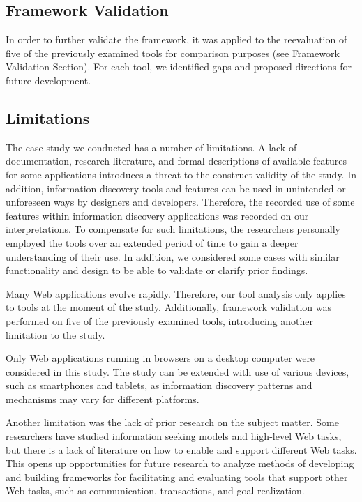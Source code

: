 \documentclass{sigchi}
\begin{document}
{\subsection{Framework Validation}
\label{subsection:validating}
In order to further validate the framework, it was applied to the reevaluation of five of the previously examined tools for comparison purposes (see Framework Validation Section). For each tool, we identified gaps and proposed directions for future development. 
}%
\pagebreak

{\subsection{Limitations}
The case study we conducted has a number of limitations. A lack of documentation, research literature, and formal descriptions of available features for some applications introduces a threat to the construct validity of the study. In addition, information discovery tools and features can be used in unintended or unforeseen ways by designers and developers. Therefore, the recorded use of some features within information discovery applications was recorded on our interpretations. To compensate for such limitations, the researchers personally employed the tools over an extended period of time to gain a deeper understanding of their use. In addition, we considered some cases with similar functionality and design to be able to validate or clarify prior findings. 

Many Web applications evolve rapidly. Therefore, our tool analysis only applies to tools at the moment of the study. Additionally, framework validation was performed on five of the previously examined tools, introducing another limitation to the study. 

Only Web applications running in browsers on a desktop computer were considered in this study. The study can be extended with use of various devices, such as smartphones and tablets, as information discovery patterns and mechanisms may vary for different platforms. 

Another limitation was the lack of prior research on the subject matter. Some researchers have studied information seeking models and high-level Web tasks, but there is a lack of literature on how to enable and support different Web tasks. This opens up opportunities for future research to analyze methods of developing and building frameworks for facilitating and evaluating tools that support other Web tasks, such as communication, transactions, and goal realization.
}
\end{document}
